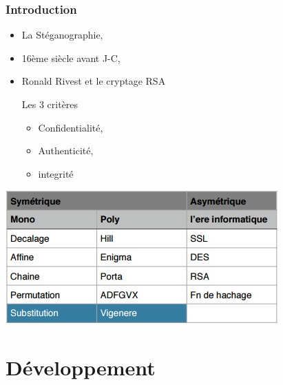 \documentclass[10pt,xcolor=table]{beamer}
\begin{document}
\begin{frame}
  \frametitle{Introduction}

  \begin{itemize}[<+->]
  \item La Stéganographie,
  \item 16ème siècle avant J-C,
  \item Ronald Rivest et le cryptage RSA
  
  \begin{block}{Les 3 critères}
    \begin{itemize}
    \item Confidentialité,
    \item Authenticité,
    \item integrité
    \end{itemize}
  \end{block}
  \end{itemize}
  \pause
  \begin{center}\includegraphics[scale=0.4]{Tab1.jpg}\end{center}

\end{frame}

\section{Développement}
\end{document}
